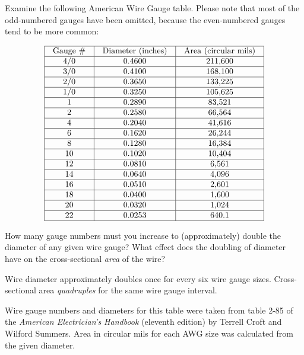 

Examine the following American Wire Gauge table.  Please note that most of the odd-numbered gauges have been omitted, because the even-numbered gauges tend to be more common:


$$\vbox{\offinterlineskip
\halign{\strut
\vrule \quad\hfil # \ \hfil & 
\vrule \quad\hfil # \ \hfil & 
\vrule \quad\hfil # \ \hfil \vrule \cr
\noalign{\hrule}
%
Gauge \# & Diameter (inches) & Area (circular mils) \cr
%
\noalign{\hrule}
%
4/0 & 0.4600 & 211,600 \cr
%
\noalign{\hrule}
%
3/0 & 0.4100 & 168,100 \cr
%
\noalign{\hrule}
%
2/0 & 0.3650 & 133,225 \cr
%
\noalign{\hrule}
%
1/0 & 0.3250 & 105,625 \cr
%
\noalign{\hrule}
%
1 & 0.2890 & 83,521 \cr
%
\noalign{\hrule}
%
2 & 0.2580 & 66,564 \cr
%
\noalign{\hrule}
%
4 & 0.2040 & 41,616 \cr
%
\noalign{\hrule}
%
6 & 0.1620 & 26,244 \cr
%
\noalign{\hrule}
%
8 & 0.1280 & 16,384 \cr
%
\noalign{\hrule}
%
10 & 0.1020 & 10,404 \cr
%
\noalign{\hrule}
%
12 & 0.0810 & 6,561 \cr
%
\noalign{\hrule}
%
14 & 0.0640 & 4,096 \cr
%
\noalign{\hrule}
%
16 & 0.0510 & 2,601 \cr
%
\noalign{\hrule}
%
18 & 0.0400 & 1,600 \cr
%
\noalign{\hrule}
%
20 & 0.0320 & 1,024 \cr
%
\noalign{\hrule}
%
22 & 0.0253 & 640.1 \cr
%
\noalign{\hrule}
} %
}$$ %

How many gauge numbers must you increase to (approximately) double the diameter of any given wire gauge?  What effect does the doubling of diameter have on the cross-sectional {\it area} of the wire?







Wire diameter approximately doubles once for every six wire gauge sizes.  Cross-sectional area {\it quadruples} for the same wire gauge interval.







Wire gauge numbers and diameters for this table were taken from table 2-85 of the {\it American Electrician's Handbook} (eleventh edition) by Terrell Croft and Wilford Summers.  Area in circular mils for each AWG size was calculated from the given diameter.




